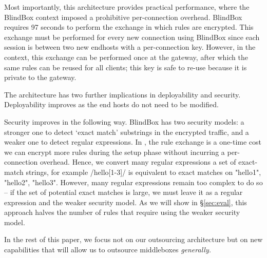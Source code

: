 Most importantly, this architecture provides practical performance, where the BlindBox context imposed a prohibitive per-connection overhead.
BlindBox requires 97 seconds to perform the exchange in which rules are encrypted.
This exchange must be performed for every new connection using BlindBox since each session is between two new endhosts with a per-connection key.
However, in the \sys context, this exchange can be performed once at the gateway, after which the same rules can be reused for all clients; this key is safe to re-use because it is private to the gateway.

The \sys architecture has two further implications in deployability and security. 
Deployability improves as the end hosts do not need to be modified.

Security improves in the following way.
BlindBox has two security models: a stronger one to detect `exact match' substrings in the encrypted traffic, and a weaker one to detect regular expressions.
In \sys, the rule exchange is a one-time cost we can encrypt more rules during the setup phase without incurring a per-connection overhead.
Hence, we convert many regular expressions  a set of exact-match strings, for example /hello[1-3]/ is equivalent to exact matches on "hello1", "hello2", "hello3".
However, many regular expressions remain too complex to do so -- if the set of potential exact matches is large, we must leave it as a regular expression and the weaker security model.
As we will show in \S\ref{sec:eval}, this approach halves the number of rules that require using the weaker security model.

In the rest of this paper, we focus not on our outsourcing architecture but on new capabilities that will allow us to outsource middleboxes {\it generally.}
